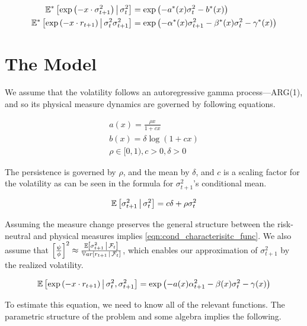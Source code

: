 \documentclass[11pt]{article}
\newcommand*{\F}{\mathcal{F}}
\newcommand*{\E}{\mathbb{E}}
\newcommand*{\Var}{\mathbb{V}ar}
\newcommand{\mvert}[1][\middle]{\ensuremath{\,#1\vert\,}}
\begin{document}
\begin{align}
    \E^{*}\left[\exp\left(-x \cdot \sigma^2_{t+1}\right) \mvert \sigma^2_t\right] &= \exp\left(-a^{*}(x)
    \sigma_t^2 - b^{*}(x)\right) \\
    \E^{*}\left[\exp\left(-x \cdot r_{t+1} \right)\mvert \sigma^2_t \sigma^2_{t+1}\right] &=
    \exp\left(-\alpha^{*}(x) \sigma^2_{t+1} - \beta^{*}(x) \sigma^2_t - \gamma^{*}(x)\right)
\end{align}


\section{The Model}


We assume that the volatility follows an autoregressive gamma process---ARG(1), and so its physical measure
dynamics are governed by following equations.

\begin{gather}
    a(x) = \frac{\rho x}{1 + c x}  \\
    b(x) = \delta \log \left(1 + c x\right) \\
    \rho \in [0, 1), c > 0, \delta > 0 
\end{gather}

The persistence is governed by $\rho$, and the mean by $\delta$, and $c$ is a scaling factor for the volatility as
can be seen in the formula for $\sigma^2_{t+1}$'s conditional mean.

\begin{equation}
    \E\left[\sigma^2_{t+1} \mvert \sigma^2_t\right] = c \delta + \rho \sigma^2_t
\end{equation}

Assuming the measure change preserves the general structure between the risk-neutral and physical measures implies
\cref{eqn:cond_characterisitc_func}.
We also assume that $\left[ \frac{\psi}{\phi} \right]^2 \approx \frac{\E \left[\sigma^2_{t+1} \mvert
\F_t\right]}{\Var\left[r_{t+1} \mvert \F_t\right]}$, which enables our approximation of $\sigma^2_{t+1}$ by the
realized volatility.

\begin{equation}
    \label{eqn:cond_characterisitc_func}
    \E\left[\exp\left(- x \cdot r_{t+1}\right) \mvert \sigma_t^2, \sigma^2_{t+1}\right] = \exp\left(- a(x)
    \alpha^2_{t+1} - \beta(x) \sigma^2_t - \gamma(x) \right) 
\end{equation}

To estimate this equation, we need to know all of the relevant functions.
The parametric structure of the problem and some algebra implies the following.
\end{document}
